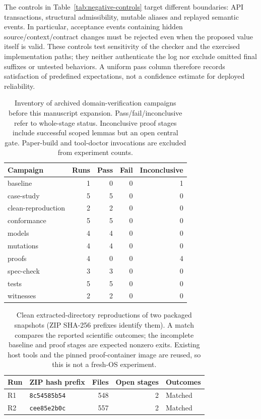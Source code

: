 \documentclass[pdflatex,sn-mathphys-num]{sn-jnl}
\theoremstyle{thmstyleone}
\theoremstyle{thmstylethree}
\theoremstyle{thmstyletwo}
\begin{document}
The controls in Table~\ref{tab:negative-controls} target different boundaries: API transactions, structural admissibility, mutable aliases and replayed semantic events. In particular, acceptance events containing hidden source/context/contract changes must be rejected even when the proposed value itself is valid. These controls test sensitivity of the checker and the exercised implementation paths; they neither authenticate the log nor exclude omitted final suffixes or untested behaviors. A uniform pass column therefore records satisfaction of predefined expectations, not a confidence estimate for deployed reliability.

\begin{table}[tbp]
\centering
\caption{Inventory of archived domain-verification campaigns before this manuscript expansion. Pass/fail/inconclusive refer to whole-stage status. Inconclusive proof stages include successful scoped lemmas but an open central gate. Paper-build and tool-doctor invocations are excluded from experiment counts.}\label{tab:campaign-history}
\footnotesize
\setlength{\tabcolsep}{3pt}
\renewcommand{\arraystretch}{1.13}
\begin{tabularx}{\linewidth}{@{}Xrrrr@{}}\toprule
Campaign & Runs & Pass & Fail & Inconclusive\\\midrule
baseline & 1 & 0 & 0 & 1\\
case-study & 5 & 5 & 0 & 0\\
clean-reproduction & 2 & 2 & 0 & 0\\
conformance & 5 & 5 & 0 & 0\\
models & 4 & 4 & 0 & 0\\
mutations & 4 & 4 & 0 & 0\\
proofs & 4 & 0 & 0 & 4\\
spec-check & 3 & 3 & 0 & 0\\
tests & 5 & 5 & 0 & 0\\
witnesses & 2 & 2 & 0 & 0\\
\bottomrule\end{tabularx}
\end{table}

\begin{table}[tbp]
\centering
\caption{Clean extracted-directory reproductions of two packaged snapshots (ZIP SHA-256 prefixes identify them). A match compares the reported scientific outcomes; the incomplete baseline and proof stages are expected nonzero exits. Existing host tools and the pinned proof-container image are reused, so this is not a fresh-OS experiment.}\label{tab:clean-reproductions}
\footnotesize
\setlength{\tabcolsep}{3pt}
\renewcommand{\arraystretch}{1.13}
\begin{tabularx}{\linewidth}{@{}llrrl@{}}\toprule
Run & ZIP hash prefix & Files & Open stages & Outcomes\\\midrule
R1 & \texttt{8c54585b54} & 548 & 2 & Matched\\
R2 & \texttt{cee85e2b0c} & 557 & 2 & Matched\\
\bottomrule\end{tabularx}
\end{table}
\end{document}
